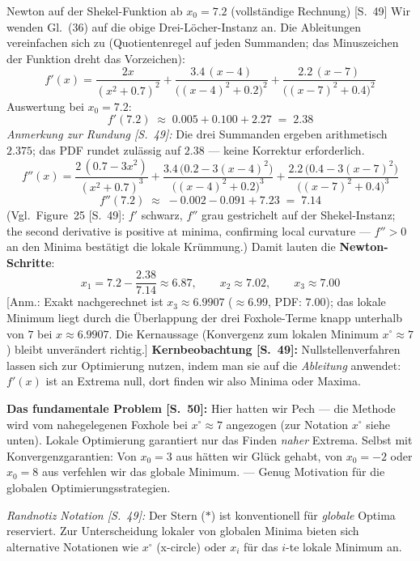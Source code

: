 \begin{bspbox}{Newton auf der Shekel-Funktion ab $x_0 = 7.2$ (vollständige Rechnung) [S.~49]}
Wir wenden Gl.~(36) auf die obige Drei-Löcher-Instanz an. Die Ableitungen vereinfachen
sich zu (Quotientenregel auf jeden Summanden; das Minuszeichen der Funktion dreht das
Vorzeichen):
\[
  f'(x) = \frac{2x}{(x^2 + 0.7)^2} + \frac{3.4\,(x-4)}{\bigl((x-4)^2 + 0.2\bigr)^2}
        + \frac{2.2\,(x-7)}{\bigl((x-7)^2 + 0.4\bigr)^2}
\]
Auswertung bei $x_0 = 7.2$:
\[
  f'(7.2) \;\approx\; 0.005 + 0.100 + 2.27 \;=\; 2.38
\]
\emph{Anmerkung zur Rundung [S.~49]:} Die drei Summanden ergeben arithmetisch $2.375$;
das PDF rundet zulässig auf $2.38$ --- keine Korrektur erforderlich.
\[
  f''(x) = \frac{2\,(0.7 - 3x^2)}{(x^2 + 0.7)^3}
         + \frac{3.4\,\bigl(0.2 - 3(x-4)^2\bigr)}{\bigl((x-4)^2 + 0.2\bigr)^3}
         + \frac{2.2\,\bigl(0.4 - 3(x-7)^2\bigr)}{\bigl((x-7)^2 + 0.4\bigr)^3}
\]
\[
  f''(7.2) \;\approx\; -0.002 - 0.091 + 7.23 \;=\; 7.14
\]
(Vgl.\ Figure~25 [S.~49]: $f'$ schwarz, $f''$ grau gestrichelt auf der
Shekel-Instanz; \glqq the second derivative is positive at minima, confirming local
curvature\grqq{} --- $f'' > 0$ an den Minima bestätigt die lokale Krümmung.)
Damit lauten die \textbf{Newton-Schritte}:
\[
  x_1 = 7.2 - \frac{2.38}{7.14} \approx 6.87, \qquad
  x_2 \approx 7.02, \qquad
  x_3 \approx 7.00
\]
[Anm.: Exakt nachgerechnet ist $x_3 \approx 6.9907$ ($\approx 6.99$, PDF: $7.00$); das lokale Minimum liegt durch die Überlappung der drei Foxhole-Terme knapp unterhalb von $7$ bei $x \approx 6.9907$. Die Kernaussage (Konvergenz zum lokalen Minimum $x^\circ \approx 7$) bleibt unverändert richtig.]
\textbf{Kernbeobachtung [S.~49]:} Nullstellenverfahren lassen sich zur Optimierung
nutzen, indem man sie auf die \emph{Ableitung} anwendet: $f'(x)$ ist an Extrema null,
dort finden wir also Minima oder Maxima.

\medskip
\textbf{Das fundamentale Problem [S.~50]:} Hier hatten wir Pech --- die Methode wird vom
nahegelegenen Foxhole bei $x^{\circ} \approx 7$ angezogen (zur Notation $x^{\circ}$
siehe unten). Lokale Optimierung garantiert nur das Finden \emph{naher} Extrema.
Selbst mit Konvergenzgarantien: Von $x_0 = 3$ aus hätten wir Glück gehabt, von
$x_0 = -2$ oder $x_0 = 8$ aus verfehlen wir das globale Minimum. --- Genug Motivation
für die globalen Optimierungsstrategien.

\medskip
\emph{Randnotiz Notation [S.~49]:} Der Stern ($*$) ist konventionell für \emph{globale}
Optima reserviert. Zur Unterscheidung lokaler von globalen Minima bieten sich
alternative Notationen wie $x^{\circ}$ (x-circle) oder $x_i$ für das $i$-te lokale
Minimum an.
\end{bspbox}

